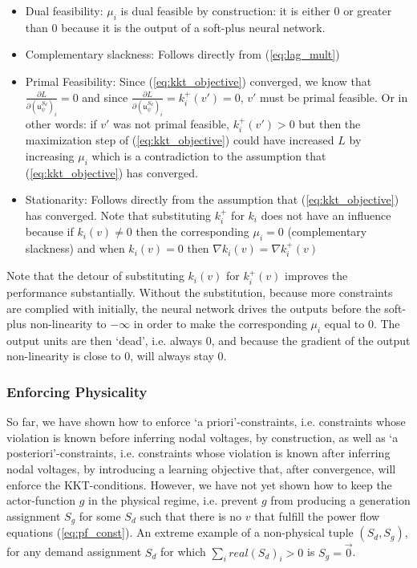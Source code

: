 \begin{itemize}
\item Dual feasibility: $\mu_i$ is dual feasible by construction: it is either $0$ or greater than $0$ because it is the output of a soft-plus neural network.
\item Complementary slackness: Follows directly from (\ref{eq:lag_mult})
\item Primal Feasibility: Since (\ref{eq:kkt_objective}) converged, we know that $\frac{\partial L}{\partial (\mathfrak{u}_\psi^{S_d})_i} = 0$ and since $\frac{\partial L}{\partial (\mathfrak{u}_\psi^{S_d})_i} = k^+_i(v') = 0$, $v'$ must be primal feasible. Or in other words: if $v'$ was not primal feasible, $k^+_i(v') > 0$ but then the maximization step of (\ref{eq:kkt_objective}) could have increased $L$ by increasing $\mu_i$ which is a contradiction to the assumption that (\ref{eq:kkt_objective}) has converged.
\item Stationarity: Follows directly from the assumption that (\ref{eq:kkt_objective}) has converged. Note that substituting $k^+_i$ for $k_i$ does not have an influence because if $k_i(v) \neq 0$ then the corresponding $\mu_i = 0$ (complementary slackness) and when $k_i(v) = 0$ then $\nabla k_i(v) = \nabla k_i^+(v)$
\end{itemize}

Note that the detour of substituting $k_i(v)$ for $k_i^+(v)$ improves the performance substantially. Without the substitution, because more constraints are complied with initially, the neural network drives the outputs before the soft-plus non-linearity to $-\infty$ in order to make the corresponding $\mu_i$ equal to 0. The output units are then `dead', i.e. always 0, and because the gradient of the output non-linearity is close to 0, will always stay 0.

\subsubsection{Enforcing Physicality}
\label{sec:enforcing_phys}
So far, we have shown how to enforce `a priori'-constraints, i.e. constraints whose violation is known before inferring nodal voltages, by construction, as well as `a posteriori'-constraints, i.e. constraints whose violation is known after inferring nodal voltages, by introducing a learning objective that, after convergence, will enforce the KKT-conditions. However, we have not yet shown how to keep the actor-function $g$ in the physical regime, i.e. prevent $g$ from producing a generation assignment $S_g$ for some $S_d$ such that there is no $v$ that fulfill the power flow equations (\ref{eq:pf_const}). An extreme example of a non-physical tuple $(S_d, S_g)$, for any demand assignment $S_d$ for which $\sum_i real(S_d)_i > 0$ is $S_g = \vec{0}$. 

